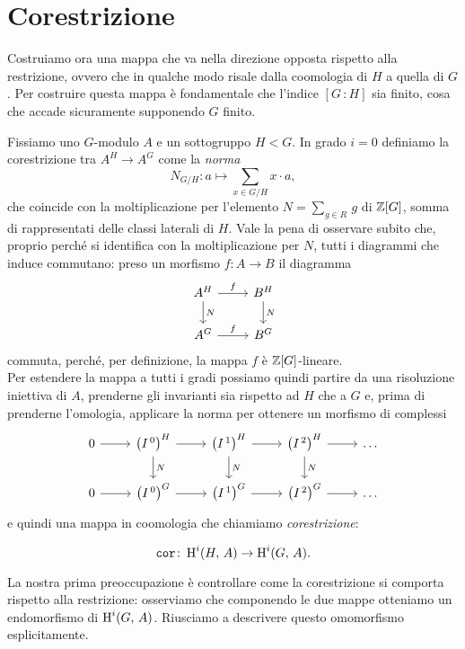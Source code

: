 \section{Corestrizione}
Costruiamo ora una mappa che va nella direzione opposta rispetto alla restrizione, ovvero che in qualche modo risale dalla coomologia di $ H $ a quella di $ G $. Per costruire questa mappa è fondamentale che l'indice $ [G \, \colon H] $ sia finito, cosa che accade sicuramente supponendo $ G $ finito.

\begin{definition}[Corestrizione]
Fissiamo uno $ G $-modulo $ A $ e un sottogruppo $ H < G $. In grado $ i = 0 $ definiamo la corestrizione tra $ A^H \to A^G $  come la \emph{norma}
\[N_{G/H} \colon a \mapsto \sum_{x \in G/H} x \cdot a, \]
che coincide con la moltiplicazione per l'elemento $ N = \sum_{g \in R} \, g $ di $ \mathbb{Z}[G] $, somma di rappresentati delle classi laterali di $ H $. Vale la pena di osservare subito che, proprio perché si identifica con la moltiplicazione per $ N $, tutti i diagrammi che induce commutano: preso un morfismo $ f \colon A \to B $ il diagramma
\[\begin{tikzcd}
A^H \rar["f"] \dar{N} 
& B^H \arrow[d, "N"]\\
A^G \rar["f"]
& B^G
\end{tikzcd}\] 
commuta, perché, per definizione, la mappa $ f $ è $ \mathbb{Z}[G] $-lineare. \\

Per estendere la mappa a tutti i gradi possiamo quindi partire da una risoluzione iniettiva di $ A $, prenderne gli invarianti sia rispetto ad $ H $ che a $ G $ e, prima di prenderne l'omologia, applicare la norma per ottenere un morfismo di complessi
\[\begin{tikzcd}
0 \rar
& \left(I^{\,0}\right)^H \rar \dar["N"]
& \left(I^{\,1}\right)^H \rar \dar["N"]
& \left(I^{\,2}\right)^H \rar \dar["N"]
& \dots \\
0 \rar
& \left(I^{\,0}\right)^{G} \rar
& \left(I^{\,1}\right)^{G} \rar
& \left(I^{\,2}\right)^{G} \rar
& \dots
\end{tikzcd} \]
e quindi una mappa in coomologia che chiamiamo \emph{corestrizione}:

\[ \operatorname{\mathtt{cor}} \colon \operatorname{H}^i(H, \, A) \to \operatorname{H}^i(G, \, A). \]

\end{definition}

La nostra prima preoccupazione è controllare come la corestrizione si comporta rispetto alla restrizione: osserviamo che componendo le due mappe otteniamo un endomorfismo di $ \operatorname{H}^i(G, \, A) $. Riusciamo a descrivere questo omomorfismo esplicitamente.

